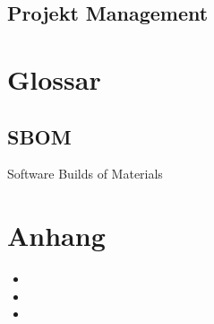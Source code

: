 \documentclass[letterpaper,10pt,ngerman]{sphinxmanual}
\begin{document}
\section{Projekt Management}
\label{\detokenize{projektmanagement/projektmanagement:projekt-management}}\label{\detokenize{projektmanagement/projektmanagement::doc}}
\sphinxstepscope


\chapter{Glossar}
\label{\detokenize{glossar:glossar}}\label{\detokenize{glossar::doc}}

\section{SBOM}
\label{\detokenize{glossar:sbom}}
\sphinxAtStartPar
Software Builds of Materials


\chapter{Anhang}
\label{\detokenize{index:anhang}}\begin{itemize}
\item {} 
\sphinxAtStartPar
{}

\item {} 
\sphinxAtStartPar
{}

\item {} 
\sphinxAtStartPar
{}

\end{itemize}



\renewcommand{\indexname}{Stichwortverzeichnis}
\printindex
\end{document}
